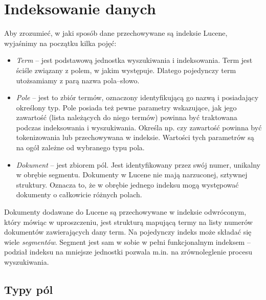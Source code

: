 \chapter{Indeksowanie danych}

Aby zrozumieć, w jaki sposób dane przechowywane są indeksie Lucene, wyjaśnimy na początku kilka pojęć:
\begin{itemize}
 \item \emph{Term} -- jest podstawową jednostka wyszukiwania i indeksowania. Term jest ściśle związany z polem, w jakim występuje. Dlatego pojedynczy term utożsamiamy z parą nazwa pola--słowo.
 \item \emph{Pole} -- jest to zbiór termów, oznaczony identyfikującą go nazwą i posiadający określony typ. Pole posiada też pewne parametry wskazujące, jak jego zawartość (lista należących do niego termów) powinna być traktowana podczas indeksowania i wyszukiwania. Określa np. czy zawartość powinna być tokenizowania lub przechowywana w indeksie. Wartości tych parametrów są na ogół zależne od wybranego typu pola.
 \item \emph{Dokument} -- jest zbiorem pól. Jest identyfikowany przez swój numer, unikalny w obrębie segmentu. Dokumenty w Lucene nie mają narzuconej, sztywnej struktury. Oznacza to, że w obrębie jednego indeksu mogą występować dokumenty o całkowicie różnych polach. 
\end{itemize}

Dokumenty dodawane do Lucene są przechowywane w indeksie odwróconym, który mówiąc w uproszczeniu, jest strukturą mapującą termy na listy numerów dokumentów zawierających dany term. Na pojedynczy indeks może składać się wiele \emph{segmentów}. Segment jest sam w sobie w pełni funkcjonalnym indeksem -- podział indeksu na mniejsze jednostki pozwala m.in. na zrównoleglenie procesu wyszukiwania.

\section{Typy pól}

